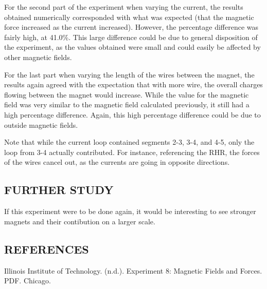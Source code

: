 \documentclass [12pt, letterpaper, twoside] {article}
\begin{document}
For the second part of the experiment when varying the current, the results obtained numerically corresponded with what was expected (that the magnetic force increased as the current increased). However, the percentage difference was fairly high, at 41.0\%. This large difference could be due to general disposition of the experiment, as the values obtained were small and could easily be affected by other magnetic fields. 

\noindent
For the last part when varying the length of the wires between the magnet, the results again agreed with the expectation that with more wire, the overall charges flowing between the magnet would increase. While the value for the magnetic field was very similar to the magnetic field calculated previously, it still had a high percentage difference. Again, this high percentage difference could be due to outside magnetic fields. 

\noindent
Note that while the current loop contained segments 2-3, 3-4, and 4-5, only the loop from 3-4 actually contributed. For instance, referencing the RHR, the forces of the wires cancel out, as the currents are going in opposite directions.

\subsection* {FURTHER STUDY}
If this experiment were to be done again, it would be interesting to see stronger magnets and their contibution on a larger scale.

\subsection* {REFERENCES}
Illinois Institute of Technology. (n.d.). Experiment 8: Magnetic Fields and Forces. PDF. Chicago.
\end{document}
